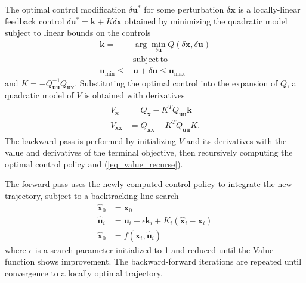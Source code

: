\documentclass[journal ]{new-aiaa}
\newcommand{\state}{\ensuremath{\mathbf{x}}}
\newcommand{\control}{\ensuremath{\mathbf{u}}}
\begin{document}
The optimal control modification $\delta\control^*$ for some perturbation $\delta\state$ is a locally-linear feedback control $\delta\control^* = \mathbf{k} + K\delta\state$ obtained by minimizing the quadratic model subject to linear bounds on the controls
\begin{align}
\mathbf{k} = &\arg\min_{\delta\control} Q(\delta\state,\delta\control) \\
&\mathrm{subject\,to\,\;} \nonumber\\
\control_{\min}\le &\control+\delta\control \le\control_{\max}
\end{align}
and $K = -Q_{\control\control}^{-1}Q_{\control\state}$. Substituting the optimal control into the expansion of $Q$, a quadratic model of $V$ is obtained with derivatives
\begin{align}
\begin{split}
\label{eq_value_recurse}
V_\state &= Q_{\state}- K^TQ_{\control\control}\mathbf{k}\\
V_{\state\state} &= Q_{\state\state} - K^TQ_{\control\control}K.
\end{split}
\end{align}
The backward pass is performed by initializing $V$ and its derivatives with the value and derivatives of the terminal objective, then recursively computing the optimal control policy and (\ref{eq_value_recurse}).

The forward pass uses the newly computed control policy to integrate the new trajectory, subject to a backtracking line search
\begin{align}
\hat{\state}_0 &= \state_0 \\
\hat{\control}_{i} &= \control_i + \epsilon \mathbf{k}_i + K_i(\hat{\state}_i - \state_i)\\
\hat{\state}_0 &= f(\hat{\state}_i,\hat{\control}_i)
\end{align}
where $\epsilon$ is a search parameter initialized to 1 and reduced until the Value function shows improvement. The backward-forward iterations are repeated until convergence to a locally optimal trajectory. 
\end{document}
